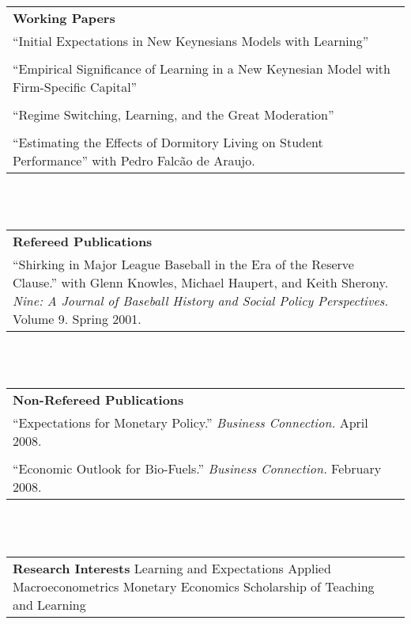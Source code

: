 \begin{tabular}{p{5.5in}}
\textbf{Working Papers} \\
``Initial Expectations in New Keynesians Models with Learning''\\\\
``Empirical Significance of Learning in a New Keynesian Model with Firm-Specific Capital''\\\\
``Regime Switching, Learning, and the Great Moderation'' \\\\
``Estimating the Effects of Dormitory Living on Student Performance'' with Pedro Falc\~{a}o de Araujo.
\end{tabular} \\ \\

\begin{tabular}{p{5.5in}}
\textbf{Refereed Publications} \\
``Shirking in Major League Baseball in the Era of the Reserve Clause.'' with Glenn Knowles, Michael Haupert, and Keith Sherony. \textit{Nine: A Journal of Baseball History and Social Policy Perspectives.}  Volume 9. Spring 2001. \\
\end{tabular} \\ \\

\begin{tabular}{p{5.5in}}
\textbf{Non-Refereed Publications} \\
``Expectations for Monetary Policy.'' \textit{Business Connection.}  April 2008. \\\\
``Economic Outlook for Bio-Fuels.'' \textit{Business Connection.}  February 2008. \\
\end{tabular} \\ \\

\begin{tabular}{p{6in}}
\textbf{Research Interests}\newline 
Learning and Expectations \newline
Applied Macroeconometrics \newline
Monetary Economics \newline
Scholarship of Teaching and Learning\newline
\end{tabular} \\ 

